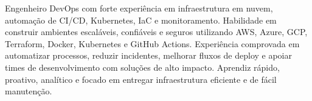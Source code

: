 Engenheiro DevOps com forte experiência em infraestrutura em nuvem, automação de CI/CD, Kubernetes, IaC e monitoramento. Habilidade em construir ambientes escaláveis, confiáveis e seguros utilizando AWS, Azure, GCP, Terraform, Docker, Kubernetes e GitHub Actions. Experiência comprovada em automatizar processos, reduzir incidentes, melhorar fluxos de deploy e apoiar times de desenvolvimento com soluções de alto impacto. Aprendiz rápido, proativo, analítico e focado em entregar infraestrutura eficiente e de fácil manutenção.